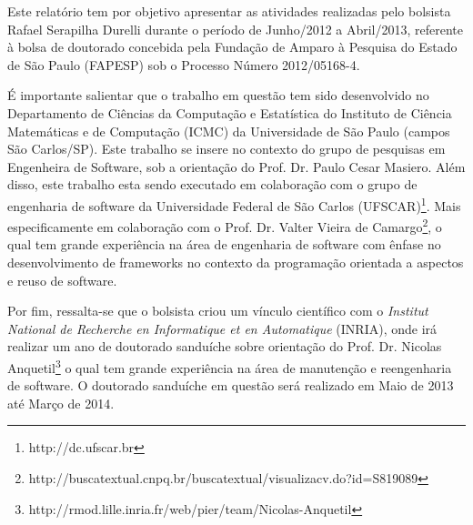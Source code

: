  Este relatório tem por objetivo apresentar as atividades realizadas pelo bolsista Rafael Serapilha Durelli durante o período de Junho/2012 a Abril/2013,
 referente à bolsa de doutorado concebida pela Fundação de Amparo à Pesquisa do Estado de São Paulo (FAPESP) sob o Processo Número 2012/05168-4. 
 
 É importante salientar que o trabalho em questão tem sido desenvolvido no Departamento de Ciências da Computação e Estatística do Instituto de Ciência 
 Matemáticas e de Computação (ICMC) da Universidade de São Paulo (campos São Carlos/SP).  
 Este trabalho se insere no contexto do grupo de pesquisas em Engenheira de Software, sob a orientação do Prof. Dr. Paulo Cesar Masiero.  
 Além disso, este trabalho esta sendo executado em colaboração com o grupo de engenharia de software da Universidade Federal de São Carlos (UFSCAR)\footnote{http://dc.ufscar.br}.  
 Mais especificamente em colaboração com o Prof. Dr. Valter Vieira de Camargo\footnote{http://buscatextual.cnpq.br/buscatextual/visualizacv.do?id=S819089},
 o qual tem grande experiência na área de engenharia de software com ênfase no desenvolvimento de frameworks no contexto da programação orientada a aspectos e reuso de software. 

Por fim, ressalta-se que o bolsista criou um vínculo científico com o \textit{Institut National de Recherche en Informatique et en Automatique} (INRIA),  
onde irá realizar um ano de doutorado sanduíche sobre orientação do  
 Prof. Dr. Nicolas Anquetil\footnote{http://rmod.lille.inria.fr/web/pier/team/Nicolas-Anquetil} o qual tem grande experiência na área de manutenção e reengenharia de software. O doutorado sanduíche em questão será realizado em Maio de 2013 até Março de 2014.